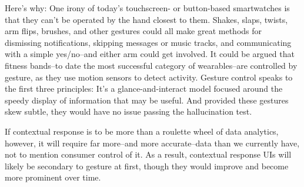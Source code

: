\documentclass{article}
\begin{document}
Here’s why: One irony of today’s touchscreen- or button-based smartwatches is that they can’t be operated by the hand closest to them. Shakes, slaps, twists, arm flips, brushes, and other gestures could all make great methods for dismissing notifications, skipping messages or music tracks, and communicating with a simple yes/no–and either arm could get involved. It could be argued that fitness bands–to date the most successful category of wearables–are controlled by gesture, as they use motion sensors to detect activity. Gesture control speaks to the first three principles: It’s a glance-and-interact model focused around the speedy display of information that may be useful. And provided these gestures skew subtle, they would have no issue passing the hallucination test.

If contextual response is to be more than a roulette wheel of data analytics, however, it will require far more–and more accurate–data than we currently have, not to mention consumer control of it. As a result, contextual response UIs will likely be secondary to gesture at first, though they would improve and become more prominent over time.




\end{document}
